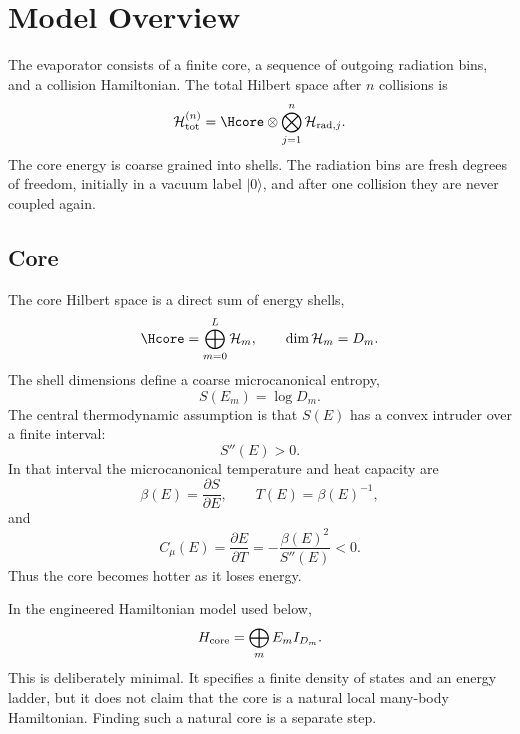 \section{Model Overview}

The evaporator consists of a finite core, a sequence of outgoing radiation bins, and a collision Hamiltonian. The total Hilbert space after $n$ collisions is
\begin{equation}
  \mathcal{H}_{\rm tot}^{(n)}
  =
  \Hcore\otimes
  \bigotimes_{j=1}^{n}\mathcal{H}_{{\rm rad},j}.
\end{equation}
The core energy is coarse grained into shells. The radiation bins are fresh degrees of freedom, initially in a vacuum label $|0\rangle$, and after one collision they are never coupled again.

\subsection{Core}

The core Hilbert space is a direct sum of energy shells,
\begin{equation}
  \Hcore=\bigoplus_{m=0}^{L}\mathcal{H}_m,
  \qquad
  \dim \mathcal{H}_m=D_m.
\end{equation}
The shell dimensions define a coarse microcanonical entropy,
\begin{equation}
  S(E_m)=\log D_m.
\end{equation}
The central thermodynamic assumption is that $S(E)$ has a convex intruder over a finite interval:
\begin{equation}
  S''(E)>0.
\end{equation}
In that interval the microcanonical temperature and heat capacity are
\begin{equation}
  \beta(E)=\frac{\partial S}{\partial E},\qquad
  T(E)=\beta(E)^{-1},
\end{equation}
and
\begin{equation}
  C_\mu(E)
  =
  \frac{\partial E}{\partial T}
  =
  -\frac{\beta(E)^2}{S''(E)}<0.
\end{equation}
Thus the core becomes hotter as it loses energy.

In the engineered Hamiltonian model used below,
\begin{equation}
  H_{\rm core}
  =
  \bigoplus_m E_m I_{D_m}.
\end{equation}
This is deliberately minimal. It specifies a finite density of states and an energy ladder, but it does not claim that the core is a natural local many-body Hamiltonian. Finding such a natural core is a separate step.

